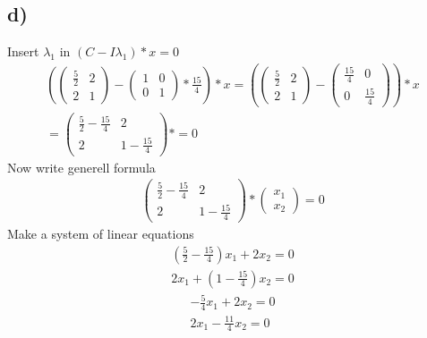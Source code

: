 \documentclass[12pt]{article}
\begin{document}
\subsection{d)}
Insert $\lambda_1$ in $(C - I\lambda_1) * x = 0 $
\begin{gather*}
    \left (
        \begin{pmatrix}
            \frac{5}{2} & 2 \\
            2 & 1 
    \end{pmatrix}
    -
   \begin{pmatrix}
       1 & 0 \\
            0 & 1 
    \end{pmatrix} 
    * \frac{15}{4} \right ) * x = 
    \left (
        \begin{pmatrix}
            \frac{5}{2} & 2 \\
            2 & 1 
    \end{pmatrix}
    -
   \begin{pmatrix}
       \frac{15}{4}  & 0 \\
       0 & \frac{15}{4} 
    \end{pmatrix} 
\right ) * x  \\
= \begin{pmatrix}
            \frac{5}{2} -\frac{15}{4} & 2 \\
            2 & 1 -\frac{15}{4} 
        \end{pmatrix} * = 0 
\end{gather*}
Now  write generell formula
\begin{gather*}
 \begin{pmatrix}
            \frac{5}{2} -\frac{15}{4} & 2 \\
            2 & 1 -\frac{15}{4} 
        \end{pmatrix}  
        *
        \begin{pmatrix}
            x_1 \\
            x_2
        \end{pmatrix}
        =
        0
\end{gather*}
Make a system of linear equations
\begin{align}
    (\frac{5}{2} -\frac{15}{4})x_1 + 2x_2 = 0  \\
    2x_1 +(1 -\frac{15}{4})x_2 = 0 
\end{align}
\begin{align}
    -\frac{5}{4}x_1 + 2x_2 = 0  \\
    2x_1 -\frac{11}{4}x_2 = 0 
\end{align}
\end{document}
